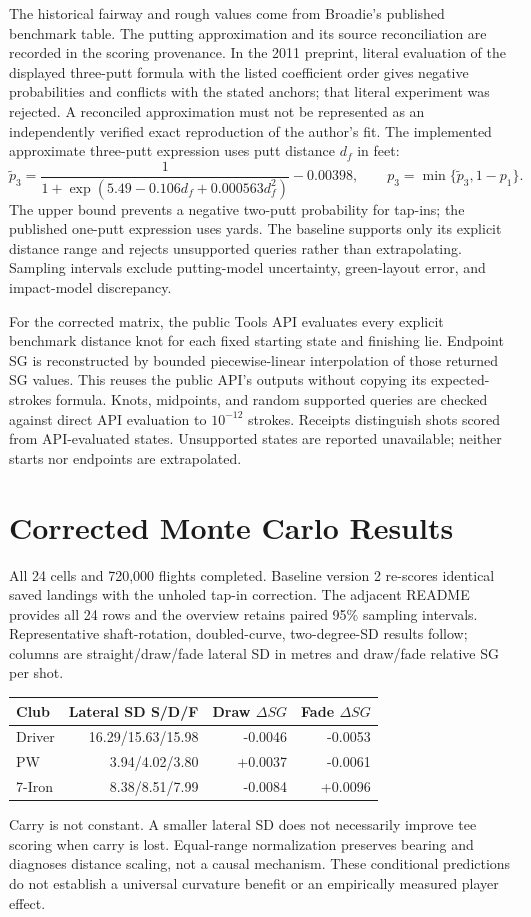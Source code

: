 \documentclass[11pt,letterpaper]{article}
\begin{document}
The historical fairway and rough values come from Broadie's published
benchmark table. The putting approximation and its source reconciliation are
recorded in the scoring provenance. In the 2011 preprint, literal evaluation
of the displayed three-putt formula with the listed coefficient order gives
negative probabilities and conflicts with the stated anchors; that literal
experiment was rejected. A reconciled approximation must not be represented
as an independently verified exact reproduction of the author's fit.
The implemented approximate three-putt expression uses putt distance $d_f$
in feet:
\[
 \widetilde p_3=\frac{1}{1+\exp(5.49-0.106d_f+0.000563d_f^2)}-0.00398,
 \qquad p_3=\min\{\widetilde p_3,1-p_1\}.
\]
The upper bound prevents a negative two-putt probability for tap-ins; the
published one-putt expression uses yards. The baseline supports only its
explicit distance range and rejects unsupported queries rather than extrapolating.
Sampling intervals exclude putting-model uncertainty, green-layout error,
and impact-model discrepancy.

For the corrected matrix, the public Tools API evaluates every explicit
benchmark distance knot for each fixed starting state and finishing lie.
Endpoint SG is reconstructed by bounded piecewise-linear interpolation of
those returned SG values. This reuses the public API's outputs without
copying its expected-strokes formula. Knots, midpoints, and random supported
queries are checked against direct API evaluation to $10^{-12}$ strokes.
Receipts distinguish shots scored from API-evaluated states. Unsupported
states are reported unavailable; neither starts nor endpoints are extrapolated.


\section{Corrected Monte Carlo Results}
All 24 cells and 720,000 flights completed. Baseline version 2 re-scores identical saved landings with the unholed tap-in correction. The adjacent README provides all 24 rows and the overview retains paired 95\% sampling intervals. Representative shaft-rotation, doubled-curve, two-degree-SD results follow; columns are straight/draw/fade lateral SD in metres and draw/fade relative SG per shot.
\begin{center}\begin{tabular}{lrrr}
\toprule Club & Lateral SD S/D/F & Draw $\Delta SG$ & Fade $\Delta SG$\\
\midrule
Driver & 16.29/15.63/15.98 & -0.0046 & -0.0053\\
PW & 3.94/4.02/3.80 & +0.0037 & -0.0061\\
7-Iron & 8.38/8.51/7.99 & -0.0084 & +0.0096\\
\bottomrule\end{tabular}\end{center}
Carry is not constant. A smaller lateral SD does not necessarily improve tee scoring when carry is lost. Equal-range normalization preserves bearing and diagnoses distance scaling, not a causal mechanism. These conditional predictions do not establish a universal curvature benefit or an empirically measured player effect.
\end{document}
